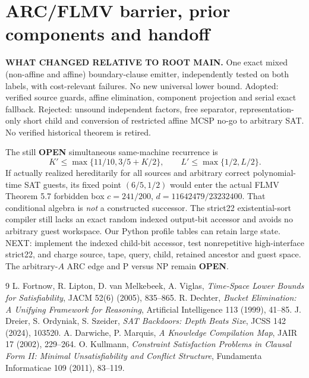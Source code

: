 \documentclass[11pt]{article}
\begin{document}
\section{ARC/FLMV barrier, prior components and handoff}
\noindent\textbf{WHAT CHANGED RELATIVE TO ROOT MAIN.} One exact mixed (non-affine and affine) boundary-clause emitter, independently tested on both labels, with cost-relevant failures. No new universal lower bound. Adopted: verified source guards, affine elimination, component projection and serial exact fallback. Rejected: unsound independent factors, free separator, representation-only short child and conversion of restricted affine MCSP no-go to arbitrary SAT. No verified historical theorem is retired.

The still \textbf{OPEN} simultaneous same-machine recurrence is
\[
K'\le\max\{11/10,3/5+K/2\},\qquad
L'\le\max\{1/2,L/2\}.
\]
If actually realized hereditarily for all sources and arbitrary correct polynomial-time SAT guests, its fixed point $(6/5,1/2)$ would enter the actual FLMV Theorem 5.7 forbidden box $c=241/200$, $d=11642479/23232400$. That conditional algebra is \emph{not} a constructed successor. The strict22 existential-sort compiler still lacks an exact random indexed output-bit accessor and avoids no arbitrary guest workspace. Our Python profile tables can retain large state. NEXT: implement the indexed child-bit accessor, test nonrepetitive high-interface strict22, and charge source, tape, query, child, retained ancestor and guest space. The arbitrary-$A$ ARC edge and P versus NP remain \textbf{OPEN}.

\begin{thebibliography}{9}
 L. Fortnow, R. Lipton, D. van Melkebeek, A. Viglas, \emph{Time-Space Lower Bounds for Satisfiability}, JACM 52(6) (2005), 835--865.
 R. Dechter, \emph{Bucket Elimination: A Unifying Framework for Reasoning}, Artificial Intelligence 113 (1999), 41--85.
 J. Dreier, S. Ordyniak, S. Szeider, \emph{SAT Backdoors: Depth Beats Size}, JCSS 142 (2024), 103520.
 A. Darwiche, P. Marquis, \emph{A Knowledge Compilation Map}, JAIR 17 (2002), 229--264.
 O. Kullmann, \emph{Constraint Satisfaction Problems in Clausal Form II: Minimal Unsatisfiability and Conflict Structure}, Fundamenta Informaticae 109 (2011), 83--119.
\end{thebibliography}
\end{document}
